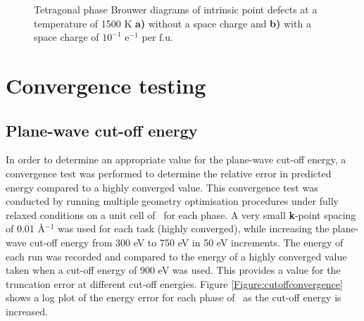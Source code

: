 \begin{figure}[ht!]
\begin{center}
		\caption{Tetragonal phase Brouwer diagrams of intrinsic point defects at a temperature of 1500 K \textbf{a)} without a space charge and \textbf{b)} with a space charge of $10^{-1}$ e$^{-1}$ per f.u.}
		\label{figure:spacechargeexample}
	\end{center}
\end{figure}

\section{Convergence testing} \label{section:convergence}

\subsection{Plane-wave cut-off energy}

In order to determine an appropriate value for the plane-wave cut-off energy, a convergence test was performed to determine the relative error in predicted energy compared to a highly converged value. This convergence test was conducted by running multiple geometry optimisation procedures under fully relaxed conditions on a unit cell of \zirconia\ for each phase. A very small \textbf{k}-point spacing of 0.01 \r{A}$^{-1}$ was used for each task (highly converged), while increasing the plane-wave cut-off energy from 300 eV to 750 eV in 50 eV increments. The energy of each run was recorded and compared to the energy of a highly converged value taken when a cut-off energy of 900 eV was used. This provides a value for the truncation error at different cut-off energies. Figure \ref{Figure:cutoffconvergence} shows a log plot of the energy error for each phase of \zirconia\ as the cut-off energy is increased. 

